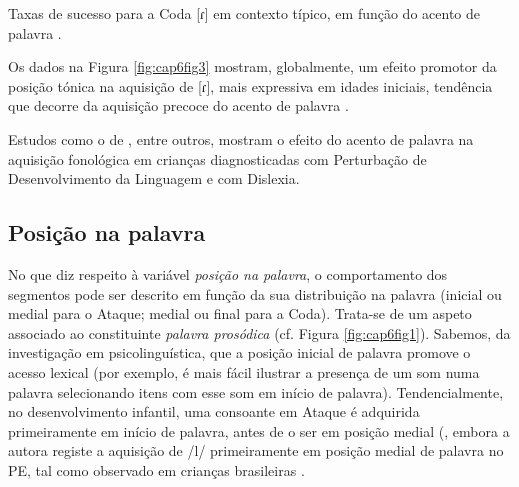 \documentclass[output=paper,colorlinks,citecolor=brown,booklanguage=portuguese]{langscibook}
\begin{document}
\begin{Figura}
    \caption{Taxas de sucesso para a Coda [ɾ] em contexto típico, em função do acento de palavra \citep{Ramalho2017}.}
    \label{fig:cap6fig3}
\end{Figura}


Os dados na Figura \ref{fig:cap6fig3} mostram, globalmente, um efeito promotor da posição tónica na aquisição de [ɾ], mais expressiva em idades iniciais, tendência que decorre da aquisição precoce do acento de palavra \citep{Correia2009, Santos2017}. 

Estudos como o de \citet{Marshall2009}, entre outros, mostram o efeito do acento de palavra na aquisição fonológica em crianças diagnosticadas com Perturbação de Desenvolvimento da Linguagem e com Dislexia.


\subsection{Posição na palavra}
No que diz respeito à variável \emph{posição na palavra}, o comportamento dos segmentos pode ser descrito em função da sua distribuição na palavra (inicial ou medial para o Ataque; medial ou final para a Coda). Trata-se de um aspeto associado ao constituinte \emph{palavra prosódica} (cf. Figura \ref{fig:cap6fig1}). Sabemos, da investigação em psicolinguística, que a posição inicial de palavra promove o acesso lexical (por exemplo, é mais fácil ilustrar a presença de um som numa palavra selecionando itens com esse som em início de palavra). Tendencialmente, no desenvolvimento infantil, uma consoante em Ataque é adquirida primeiramente em início de palavra, antes de o ser em posição medial (\citealp{Costa2010}, embora a autora registe a aquisição de /l/ primeiramente em posição medial de palavra no PE, tal como observado em crianças brasileiras \citep{MatzenauerHernandorena1997}.
\end{document}
